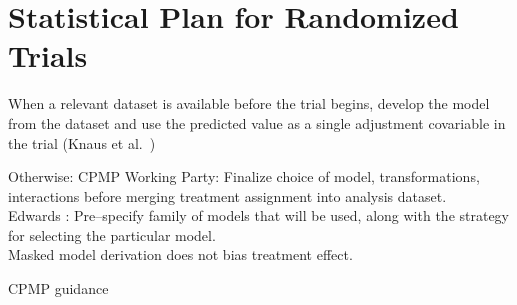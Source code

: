 \section{Statistical Plan for Randomized Trials}
\bi
\item   When a relevant dataset is available before the trial begins,
        develop the model from the dataset and use the predicted value as a
        single adjustment covariable in the trial (Knaus et al.~\cite{kna93cli})
\item   Otherwise: CPMP Working Party: Finalize choice of model,
        transformations, interactions before merging treatment assignment
        into analysis dataset. \\
        Edwards \cite{edw99mod}: Pre--specify family of models that
        will be used, along with
        the strategy for selecting the particular model. \\
        Masked model derivation does not bias treatment effect.
\item CPMP guidance~\cite{cpmp04poi}

